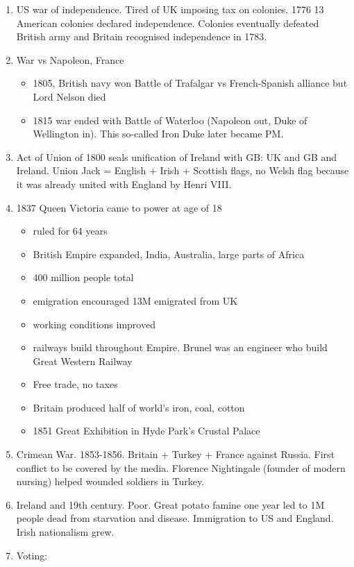 \documentclass{amsart}
\begin{document}
\begin{enumerate}
\begin{itemize}
			\end{itemize}
	\item US war of independence. Tired of UK imposing tax on colonies. 1776 13 American colonies declared independence. Colonies eventually defeated British army and Britain recognised independence in 1783. 
	\item War vs Napoleon, France
		\begin{itemize}
			\item 1805, British navy won Battle of Trafalgar vs French-Spanish alliance but Lord Nelson died
			\item 1815 war ended with Battle of Waterloo (Napoleon out, Duke of Wellington in). This so-called Iron Duke later became PM.
		\end{itemize}							
	\item Act of Union of 1800 seals unification of Ireland with GB: UK and GB and Ireland. Union Jack = English + Irish + Scottish flags, no Welsh flag because it was already united with England by Henri VIII.
	\item 1837 Queen Victoria came to power at age of 18
		\begin{itemize}
			\item ruled for 64 years
			\item British Empire expanded, India, Australia, large parts of Africa
			\item 400 million people total
			\item emigration encouraged 13M emigrated from UK
			\item working conditions improved
			\item railways build throughout Empire. Brunel was an engineer who build Great Western Railway
			\item Free trade, no taxes
			\item Britain produced half of world's iron, coal, cotton
			\item 1851 Great Exhibition in Hyde Park's Crustal Palace
		\end{itemize}
	\item Crimean War. 1853-1856. Britain + Turkey + France against Russia. First conflict to be covered by the media.
Florence Nightingale (founder of modern nursing) helped wounded soldiers in Turkey. 
	\item Ireland and 19th century. Poor. Great potato famine one year led to 1M people dead from starvation and disease. Immigration to US and England. Irish nationalism grew. 
	\item Voting:

\end{enumerate}
\end{document}
